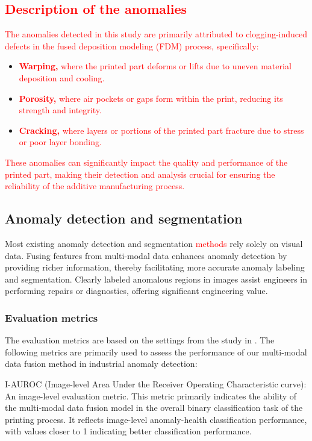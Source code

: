 \documentclass[preprint,12pt]{elsarticle}
\begin{document}
\subsection{\textcolor{red}{Description of the anomalies}}
\textcolor{red}{The anomalies detected in this study are primarily attributed to clogging-induced defects in the fused deposition modeling (FDM) process, specifically:}

\begin{itemize}
  \item \textcolor{red}{\textbf{Warping,} where the printed part deforms or lifts due to uneven material deposition and cooling.}
    \item \textcolor{red}{\textbf{Porosity, } where air pockets or gaps form within the print, reducing its strength and integrity.}
    \item \textcolor{red}{\textbf{Cracking,} where layers or portions of the printed part fracture due to stress or poor layer bonding.}
\end{itemize}

\textcolor{red}{These anomalies can significantly impact the quality and performance of the printed part, making their detection and analysis crucial for ensuring the reliability of the additive manufacturing process.}

\subsection{Anomaly detection and segmentation}

Most existing anomaly detection and segmentation \textcolor{red}{methods} rely solely on visual data. Fusing features from multi-modal data enhances anomaly detection by providing richer information, thereby facilitating more accurate anomaly labeling and segmentation. Clearly labeled anomalous regions in images assist engineers in performing repairs or diagnostics, offering significant engineering value.

\subsubsection{Evaluation metrics}
The evaluation metrics are based on the settings from the study in \cite{RN335}. The following metrics are primarily used to assess the performance of our multi-modal data fusion method in industrial anomaly detection:

    I-AUROC (Image-level Area Under the Receiver Operating Characteristic curve): An image-level evaluation metric. This metric primarily indicates the ability of the multi-modal data fusion model in the overall binary classification task of the printing process. It reflects image-level anomaly-health classification performance, with values closer to 1 indicating better classification performance.
\end{document}
